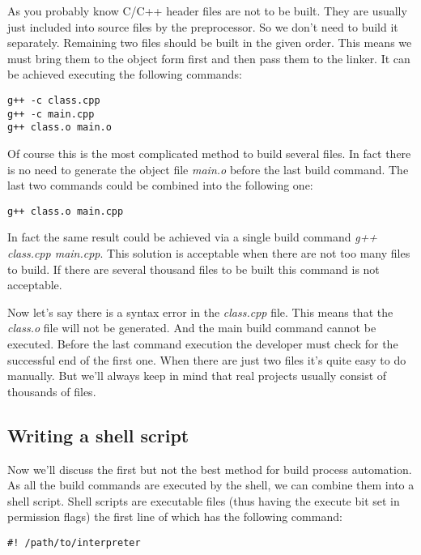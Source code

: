 As you probably know C/C++ header files are not to be built. They are usually just included into source files by the preprocessor. So we don't need to build it separately. Remaining two files should be built in the given order. This means we must bring them to the object form first and then pass them to the linker. It can be achieved executing the following commands:

\begin{lstlisting}[numbers=none]
g++ -c class.cpp 
g++ -c main.cpp  
g++ class.o main.o
\end{lstlisting}

Of course this is the most complicated method to build several files. In fact there is no need to generate the object file \textit { main.o} before the last build command. The last two commands could be combined into the following one:

\begin{lstlisting}[numbers=none]
g++ class.o main.cpp
\end{lstlisting}

{\remark In fact the same result could be achieved via a single build command \textit { g++ class.cpp main.cpp}. This solution is acceptable when there are not too many files to build. If there are several thousand files to be built this command is not acceptable.}

Now let's say there is a syntax error in the \textit { class.cpp} file. This means that the \textit { class.o} file will not be generated. And the main build command cannot be executed. Before the last command execution the developer must check for the successful end of the first one. When there are just two files it's quite easy to do manually. But we'll always keep in mind that real projects usually consist of thousands of files.

\subsection{Writing a shell script}
Now we'll discuss the first but not the best method for build process automation. As all the build commands are executed by the shell, we can combine them into a shell script. Shell scripts are executable files (thus having the execute bit set in permission flags) the first line of which has the following command:

\begin{lstlisting}[numbers=none]
#! /path/to/interpreter
\end{lstlisting}

